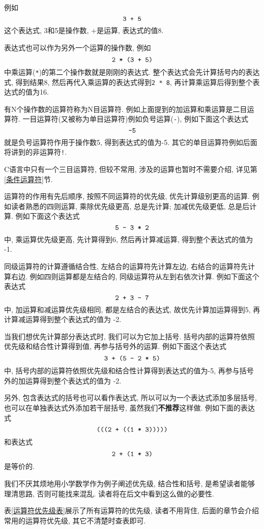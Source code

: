         例如
            \[ \mbox{\texttt{3 + 5}} \]
        这个表达式, 3和5是操作数, +是运算, 表达式的值8.

        表达式也可以作为另外一个运算的操作数, 例如
            \[ \mbox{\texttt{2 * (3 + 5)}} \]
        中乘运算(\texttt{*})的第二个操作数就是刚刚的表达式. 整个表达式会先计算括号内的表达式, 得到结果8, 然后再代入乘运算的表达式得到\texttt{2 * 8}, 再计算乘运算后得到整个表达式的值为16.

        有N个操作数的运算符称为N目运算符. 例如上面提到的加运算和乘运算是二目运算符. 一目运算符(又被称为单目运算符)例如负号运算(\texttt{-}), 例如下面这个表达式
            \[ \mbox{\texttt{-5}} \]
        就是负号运算符作用于操作数5, 得到表达式的值为-5. 其它的单目运算符例如后面将讲到的非运算符\texttt{!}.

        C语言中只有一个三目运算符, 但较不常用, 涉及的运算也暂时不需要介绍, 详见第\ref{条件运算符}节.

        运算符的作用有先后顺序, 按照不同运算符的优先级, 优先计算级别更高的运算. 例如读者熟悉的四则运算, 乘除优先级更高, 总是先计算; 加减优先级更低, 总是后计算. 例如下面这个表达式
            \[ \mbox{\texttt{5 - 3 * 2}} \]
        中, 乘运算优先级更高, 先计算得到6, 然后再计算减运算, 得到整个表达式的值为 -1.
        
        同级运算符的计算遵循结合性, 左结合的运算符先计算左边, 右结合的运算符先计算右边. 例如四则运算都是左结合的, 同级运算符从左到右依次计算. 例如下面这个表达式
            \[\mbox{\texttt{2 + 3 - 7}} \]
        中, 加运算和减运算优先级相同, 都是左结合的表达式, 故优先计算加运算得到5, 再计算减运算得到整个表达式的值为 -2.
        
        当我们想优先计算部分表达式时, 我们可以为它加上括号. 括号内部的运算符依照优先级和结合性计算得到值, 再参与括号外的运算. 例如下面这个表达式
            \[ \mbox{\texttt{3 + (5 - 2 * 5)}} \]
        中, 括号内部的运算符依照优先级和结合性计算得到表达式的值为-5, 再参与括号外的加运算得到整个表达式的值为 -2.

        另外, 包含表达式的括号也可以看作表达式, 所以可以为一个表达式添加多层括号, 也可以在单独表达式外添加若干层括号, 虽然我们\textbf{不推荐}这样做. 例如下面的表达式
            \[ \mbox{\texttt{(((2 + ((1 * 3)))))}} \]
        和表达式
            \[ \mbox{\texttt{2 + (1 * 3)}} \]
        是等价的.

        我们不厌其烦地用小学数学作为例子阐述优先级, 结合性和括号, 是希望读者能够理清思路, 否则可能找来混乱. 读者将在后文中看到这么做的必要性.

        表\ref{运算符优先级表}展示了所有运算符的优先级, 读者不用背住, 后面的章节会介绍常用的运算符优先级, 其它不清楚时查表即可. 

